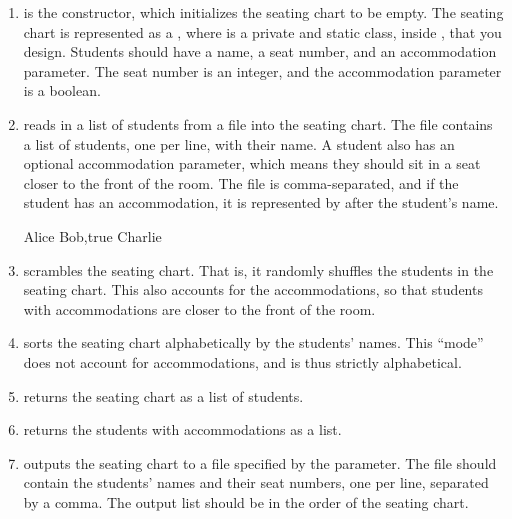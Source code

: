\begin{enumerate}[label=(\alph*)]
    \item {} is the constructor, which initializes the seating chart to be empty. The seating chart is represented as a , where  is a private and static class, inside , that you design. Students should have a name, a seat number, and an accommodation parameter. The seat number is an integer, and the accommodation parameter is a boolean.

    \item {} reads in a list of students from a file into the seating chart. The file contains a list of students, one per line, with their name. A student also has an optional accommodation parameter, which means they should sit in a seat closer to the front of the room. The file is comma-separated, and if the student has an accommodation, it is represented by  after the student's name.
    \begin{verbnobox}[\small]
Alice
Bob,true
Charlie
    \end{verbnobox}
    \item {} scrambles the seating chart. That is, it randomly shuffles the students in the seating chart. This also accounts for the accommodations, so that students with accommodations are closer to the front of the room.
    \item {} sorts the seating chart alphabetically by the students' names. This ``mode'' does not account for accommodations, and is thus strictly alphabetical.
    \item {} returns the seating chart as a list of students.
    \item {} returns the students with accommodations as a list.
    \item {} outputs the seating chart to a file specified by the parameter. The file should contain the students' names and their seat numbers, one per line, separated by a comma. The output list should be in the order of the seating chart.
\end{enumerate}

\newpage %

